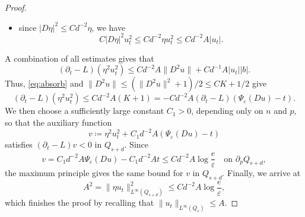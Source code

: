 \documentclass[10pt,a4paper]{amsart}
\begin{document}
\begin{proof}
\begin{itemize}
    \item since $|D\eta|^2 \leq Cd^{-2}\eta$, we have
    \begin{equation*}
        C|D\eta|^2u_t^2 \leq Cd^{-2}\eta u_t^2 \leq Cd^{-2}A|u_t|.
    \end{equation*}
\end{itemize}
A combination of all estimates gives that
\begin{equation}\label{eq:product}
 (\partial_t-L)(\eta^2u_t^2)
 \leq Cd^{-2}A\|D^2u\|+Cd^{-1}A|u_t||b|.
\end{equation}
Thus, \eqref{eq:absorb} and $\|D^2u\|\leq (\|D^2u\|^2+1)/2\leq CK+1/2$ give
\begin{equation*}
    (\partial_t-L)(\eta^2u_t^2) \leq Cd^{-2}A(K+1)=-Cd^{-2}A (\partial_t-L)(\Psi_{\varepsilon}(Du)-t).
\end{equation*}
We then choose a sufficiently large constant $C_1>0$, depending only on $n$ and $p$, so that the auxiliary function
\begin{equation*}
     v\coloneqq\eta^2u_t^2 + C_1d^{-2}A(\Psi_\varepsilon(Du)-t)
\end{equation*}
satisfies $(\partial_t-L)v<0$ in $Q_{s+d}$. Since
\begin{equation*}
     v=C_1d^{-2}A\Psi_\varepsilon(Du)-C_1d^{-2}At\leq Cd^{-2}A\log\frac e\varepsilon \quad \text{on $\partial_pQ_{s+d}$},
\end{equation*}
the maximum principle gives the same bound for $v$ in $Q_{s+d}$. Finally, we arrive at
\begin{equation*}
    A^2=\|\eta u_t\|_{L^{\infty}(Q_{s+d})}^2 \leq Cd^{-2}A\log\frac e\varepsilon,
\end{equation*}
which finishes the proof by recalling that $\|u_t\|_{L^{\infty}(Q_s)} \leq A$.
\end{proof}
\end{document}
